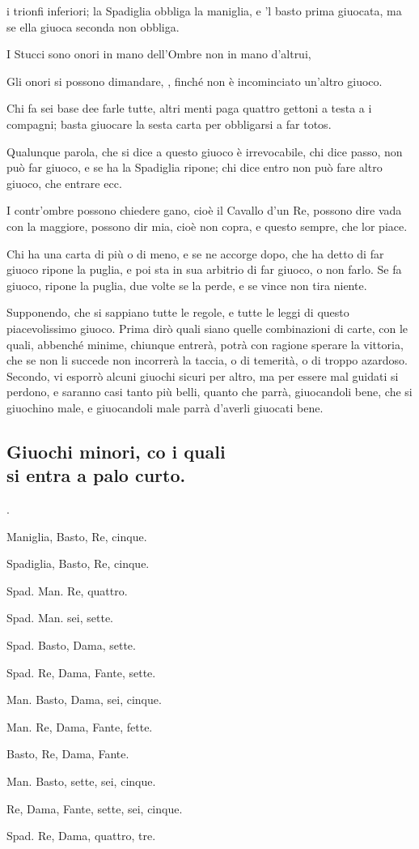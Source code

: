 \documentclass[11pt,a6paper]{article}
\newcounter{listombrecnt}
\newenvironment{listombre}{
  \begin{list}
    {\arabic{listombrecnt}.}
    {\usecounter{listombrecnt}
      \setlength{\labelwidth}{0.3pt}
      \setlength{\labelsep}{0.3em}
      \setlength{\itemsep}{-0.2em}
      \setlength{\leftmargin}{0em}
      \setlength{\itemindent}{0.6em} %
    }
}{\end{list}}
\begin{document}
\begin{list}
 i trionfi inferiori; la Spadiglia obbliga la
 maniglia, e 'l basto prima giuocata, ma se ella
 giuoca seconda non obbliga.
\item I Stucci sono onori in mano dell'Ombre
 non in mano d'altrui,
\item Gli onori si possono dimandare, , finché
 non è incominciato un'altro giuoco.
\item Chi fa sei base dee farle tutte, altri
 menti paga quattro gettoni a testa a i compagni;
 basta giuocare la sesta carta per obbligarsi
 a far totos.
\item Qualunque parola, che si dice a questo
 giuoco è irrevocabile, chi dice passo, non
 può far giuoco, e se ha la Spadiglia ripone;
 chi dice entro non può fare altro giuoco, che
 entrare ecc.
\item I contr'ombre possono chiedere gano,
 cioè il Cavallo d'un Re, possono dire vada
 con la maggiore, possono dir mia, cioè
 non copra, e questo sempre, che lor piace.
\item Chi ha una carta di più o di meno,
 e se ne accorge dopo, che ha detto di far
 giuoco ripone la puglia, e poi sta in sua arbitrio
 di far giuoco, o non farlo. Se fa giuoco,
 ripone la puglia, due volte se la perde, e se
 vince non tira niente.
\end{list}
Supponendo, che si sappiano tutte le regole,
e tutte le leggi di questo piacevolissimo
giuoco. Prima dirò quali siano quelle combinazioni
di carte, con le quali, abbenché minime,
chiunque entrerà, potrà con ragione
sperare la vittoria, che se non li succede non
incorrerà la taccia, o di temerità, o di
troppo azardoso. Secondo, vi esporrò alcuni giuochi
sicuri per altro, ma per essere mal guidati
si perdono, e saranno casi tanto più belli,
quanto che parrà, giuocandoli bene, che si
giuochino male, e giuocandoli male parrà
d'averli giuocati bene.

\subsection{Giuochi minori, co i quali\\ si entra a palo curto.}

\begin{listombre}
\item Maniglia, Basto, Re, cinque.
\item Spadiglia, Basto, Re, cinque.
\item Spad. Man. Re, quattro.
\item Spad. Man. sei, sette.
\item Spad. Basto, Dama, sette.
\item Spad. Re, Dama, Fante, sette.
\item Man. Basto, Dama, sei, cinque.
\item Man. Re, Dama, Fante, fette.
\item Basto, Re, Dama, Fante.
\item Man. Basto, sette, sei, cinque.
\item Re, Dama, Fante, sette, sei, cinque.
\item Spad. Re, Dama, quattro, tre.
\end{listombre}
\end{document}
